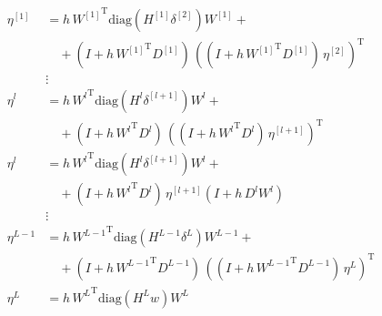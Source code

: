 \begin{align*}
    \eta^{[1]} & = h \, {W^{[1]}}^{\mathrm{T}} \mathrm{diag} \left( H^{[1]} \delta^{[2]} \right) W^{[1]} + \\
    & \quad + \left( I + h \, {W^{[1]}}^{\mathrm{T}} D^{[1]} \right) \, \left( \left( I + h \, {W^{[1]}}^{\mathrm{T}} D^{[1]} \right) \, \eta^{[2]} \right)^{\mathrm{T}} \\ 
    &\vdots\\
    \eta^{l} & = h \, {W^{l}}^{\mathrm{T}} \mathrm{diag} \left( H^{l} \delta^{[l+1]} \right) W^{l} + \\
    & \quad + \left( I + h \, {W^{l}}^{\mathrm{T}} D^{l} \right) \, \left( \left( I + h \, {W^{l}}^{\mathrm{T}} D^{l} \right) \, \eta^{[l+1]} \right)^{\mathrm{T}} \\ 
    \eta^{l} & = h \, {W^{l}}^{\mathrm{T}} \mathrm{diag} \left( H^{l} \delta^{[l+1]} \right) W^{l} + \\
    & \quad + \left( I + h \, {W^{l}}^{\mathrm{T}} D^{l} \right) \, \eta^{[l+1]}  \left( I + h \,  D^{l} {W^{l}} \right) \\ 
    &\vdots\\
    \eta^{L-1} & = h \, {W^{L-1}}^{\mathrm{T}} \mathrm{diag} \left( H^{L-1} \delta^{L} \right) W^{L-1} + \\
    & \quad + \left( I + h \, {W^{L-1}}^{\mathrm{T}} D^{L-1} \right) \, \left( \left( I + h \, {W^{L-1}}^{\mathrm{T}} D^{L-1} \right) \, \eta^{L} \right)^{\mathrm{T}} \\
    \eta^{L} &  = h \, {W^{L}}^{\mathrm{T}} \mathrm{diag}\left(H^{L} w\right) W^{L} 
\end{align*}

